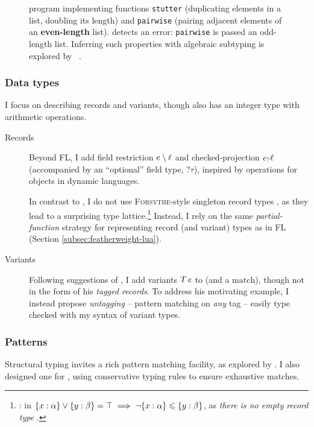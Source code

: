 \begin{figure}[p]
    \centering
    
    \caption{\fabric{} program implementing functions \texttt{stutter} (duplicating elements in a list, doubling its length) and \texttt{pairwise} (pairing adjacent elements of an \textbf{even-length} list). \inference{} detects an error: \texttt{pairwise} is passed an odd-length list. Inferring such properties with algebraic subtyping is explored by \citeauthor*{structural-refinement-types}~\cite{structural-refinement-types}.}
    \label{fig:fabric-example-pairwise}
\end{figure}

\subsubsection{Data types}

I focus on describing records and variants, though \fabric{} also has \eg{} an integer type with arithmetic operations.
\begin{description}
\item[Records]
Beyond FL, I add field restriction $e \setminus \ell$ \cite{operations-on-records} and checked-projection ${e}_?{\ell}$ (accompanied by an \enquote{optional} field type, $?\boxed{\tau}$), inspired by operations for objects in dynamic languages.

In contrast to \textcite{mlstruct}, I do not use \textsc{Forsythe}-style singleton record types \cite{forsythe}, as they lead to a surprising type lattice.\footnote{\eg{}: in \mlstruct{} $\flrec{x : \alpha} \join \flrec{y: \beta} = \top \implies \comp \flrec{ x : \alpha } \sub \flrec{ y : \beta } $, as \emph{there is no empty record type} \cite[Section~4.4.5]{mlstruct}.} Instead, I rely on the same \emph{partial-function} strategy for representing record (and variant) types as in FL (Section \ref{subsec:featherweight-lua}).

\item[Variants] Following suggestions of \textcite[Section~9.2]{dolan-thesis}, I add variants $T\,e$ to \fabric{} (and a $\mathrm{match}$), though not in the form of his \emph{tagged records}. To address his motivating example, I instead propose \emph{untagging} -- pattern matching on \emph{any} tag -- easily type checked with my syntax of variant types.
\end{description}

\subsubsection{Patterns}
Structural typing invites a rich pattern matching facility, as explored by \eg{} \textcite{parreaux-patterns}. I also designed one for \fabric{}, using conservative typing rules to ensure exhaustive matches. 

